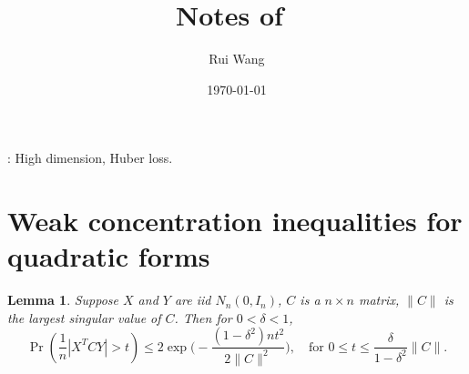 \documentclass[11pt]{article}
\theoremstyle{plain}
\newtheorem{lemma}{\quad\quad Lemma}
\theoremstyle{definition}
\theoremstyle{remark}
\begin{document}
\title{Notes of~\cite{paul2007asymptotics}}
\author{Rui Wang \vspace{0.1in}\\}
\date{\today}
\maketitle

\begin{abstract}
\end{abstract}

\/: High dimension, Huber loss.


\section{Weak concentration inequalities for quadratic forms}
\begin{lemma}
    Suppose $X$ and $Y$ are iid $N_n(0,I_n)$, $C$ is a $n\times n$ matrix, $\|C\|$ is the largest singular value of $C$. Then for $0<\delta<1$,
    $$
    \Pr(\frac{1}{n}|X^T C Y|>t) \leq 2 \exp\Big(-\frac{(1-\delta^2)nt^2}{2\|C\|^2}\Big),\quad \text{for $0\leq t\leq \frac{\delta}{1-\delta^2}\|C\|$}.
    $$
\end{lemma}
\end{document}
